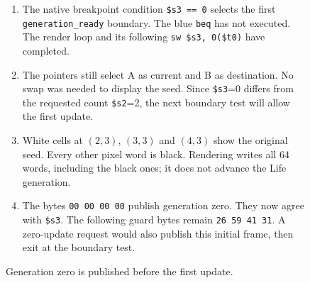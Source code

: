 \begin{figure}[htbp]
  \par\smallskip
  \begin{minipage}{\linewidth}
    \small
    \begin{enumerate}
      \item The native breakpoint condition \texttt{\$s3 == 0} selects the first \texttt{generation\_ready} boundary. The blue \texttt{beq} has not executed. The render loop and its following \texttt{sw \$s3, 0(\$t0)} have completed.
      \item The pointers still select A as current and B as destination. No swap was needed to display the seed. Since \texttt{\$s3}=0 differs from the requested count \texttt{\$s2}=2, the next boundary test will allow the first update.
      \item White cells at $(2,3)$, $(3,3)$ and $(4,3)$ show the original seed. Every other pixel word is black. Rendering writes all 64 words, including the black ones; it does not advance the Life generation.
      \item The bytes \texttt{00 00 00 00} publish generation zero. They now agree with \texttt{\$s3}. The following guard bytes remain \texttt{26 59 41 31}. A zero-update request would also publish this initial frame, then exit at the boundary test.
    \end{enumerate}
  \end{minipage}
  \caption{Generation zero is published before the first update.}
  \label{capture:008-life-generations-f02-zero}
\end{figure}
\par
